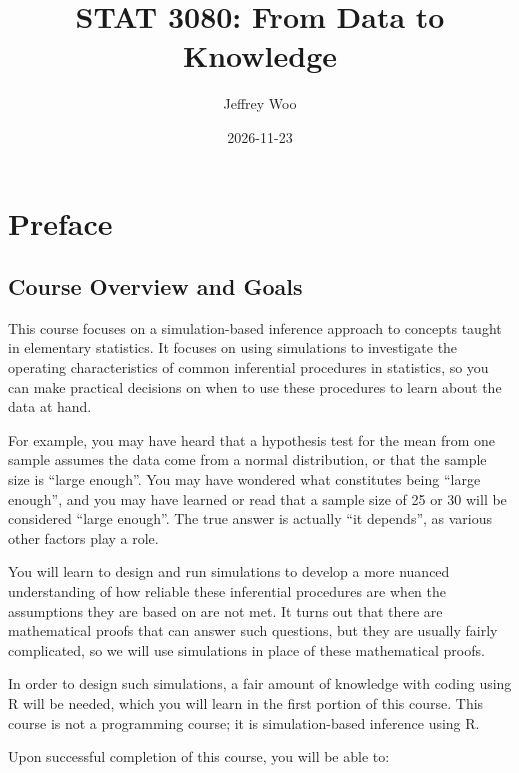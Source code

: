 \documentclass[
]{book}
\title{STAT 3080: From Data to Knowledge}
\author{Jeffrey Woo}
\date{2026-11-23}
\theoremstyle{definition}
\theoremstyle{definition}
\theoremstyle{definition}
\theoremstyle{definition}
\theoremstyle{remark}
\begin{document}
\maketitle

{
\setcounter{tocdepth}{1}
\tableofcontents
}
\hypertarget{preface}{%
\chapter*{Preface}\label{preface}}

\hypertarget{course-overview-and-goals}{%
\section*{Course Overview and Goals}\label{course-overview-and-goals}}

This course focuses on a simulation-based inference approach to concepts taught in elementary statistics. It focuses on using simulations to investigate the operating characteristics of common inferential procedures in statistics, so you can make practical decisions on when to use these procedures to learn about the data at hand.

For example, you may have heard that a hypothesis test for the mean from one sample assumes the data come from a normal distribution, or that the sample size is ``large enough''. You may have wondered what constitutes being ``large enough'', and you may have learned or read that a sample size of 25 or 30 will be considered ``large enough''. The true answer is actually ``it depends'', as various other factors play a role.

You will learn to design and run simulations to develop a more nuanced understanding of how reliable these inferential procedures are when the assumptions they are based on are not met. It turns out that there are mathematical proofs that can answer such questions, but they are usually fairly complicated, so we will use simulations in place of these mathematical proofs.

In order to design such simulations, a fair amount of knowledge with coding using R will be needed, which you will learn in the first portion of this course. This course is not a programming course; it is simulation-based inference using R.

Upon successful completion of this course, you will be able to:
\end{document}

